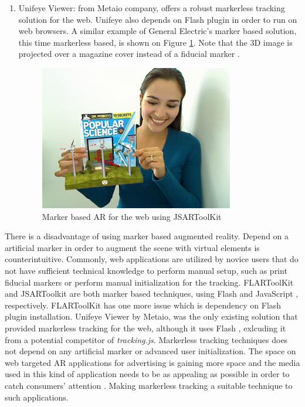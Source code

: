 \begin{enumerate}
    \item Unifeye Viewer: from Metaio company, offers a robust markerless tracking solution for the web. Unifeye \cite{Metaio2009} also depends on Flash \cite{Flash2013} plugin in order to run on web browsers. A similar example of General Electric's marker based solution, this time markerless based, is shown on Figure \ref{figure:unifeyeviewer}. Note that the 3D image is projected over a magazine cover instead of a fiducial marker \cite{Cho1998}.

    \begin{figure}[!htb]
      \centering
      \includegraphics[width=240pt]{chapters/computer_vision_library_for_the_web/unifeyeviewer.png}
      \caption{Marker based AR for the web using JSARToolKit}
      \label{figure:unifeyeviewer}
    \end{figure}
\end{enumerate}

There is a disadvantage of using marker based augmented reality. Depend on a artificial marker in order to augment the scene with virtual elements is counterintuitive. Commonly, web applications are utilized by novice users that do not have sufficient technical knowledge to perform manual setup, such as print fiducial markers or perform manual initialization for the tracking. FLARToolKit \cite{Yan2011} and JSARToolkit \cite{JSARToolkit2011} are both marker based techniques, using Flash \cite{Flash2013} and JavaScript \cite{International2009}, respectively. FLARToolKit has one more issue which is dependency on Flash \cite{Flash2013} plugin installation. Unifeye Viewer by Metaio, was the only existing solution that provided markerless tracking for the web, although it uses Flash \cite{Flash2013}, exlcuding it from a potential competitor of \textit{tracking.js}. Markerless tracking techniques does not depend on any artificial marker or advanced user initialization. The space on web targeted AR applications for advertising is gaining more space and the media used in this kind of application needs to be as appealing as possible in order to catch consumers’ attention \cite{Pablo2013}. Making markerless tracking a suitable technique to such applications.

